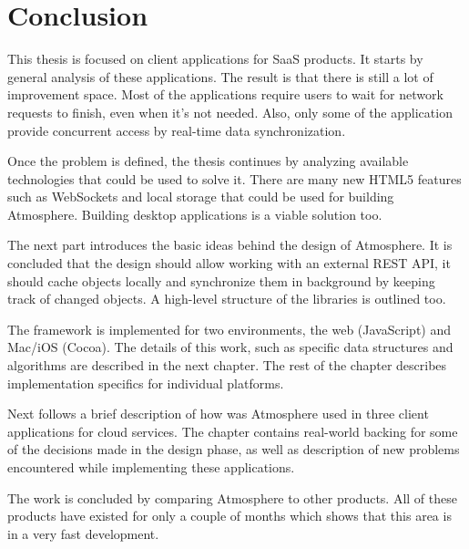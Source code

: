 \section{Conclusion}

This thesis is focused on client applications for SaaS products. It starts by general analysis of these applications. The result is that there is still a lot of improvement space. Most of the applications require users to wait for network requests to finish, even when it's not needed. Also, only some of the application provide concurrent access by real-time data synchronization.

Once the problem is defined, the thesis continues by analyzing available technologies that could be used to solve it. There are many new HTML5 features such as WebSockets and local storage that could be used for building Atmosphere. Building desktop applications is a viable solution too.

The next part introduces the basic ideas behind the design of Atmosphere. It is concluded that the design should allow working with an external REST API, it should cache objects locally and synchronize them in background by keeping track of changed objects. A high-level structure of the libraries is outlined too.

The framework is implemented for two environments, the web (JavaScript) and Mac/iOS (Cocoa). The details of this work, such as specific data structures and algorithms are described in the next chapter. The rest of the chapter describes implementation specifics for individual platforms.

Next follows a brief description of how was Atmosphere used in three client applications for cloud services. The chapter contains real-world backing for some of the decisions made in the design phase, as well as description of new problems encountered while implementing these applications.

The work is concluded by comparing Atmosphere to other products. All of these products have existed for only a couple of months which shows that this area is in a very fast development.